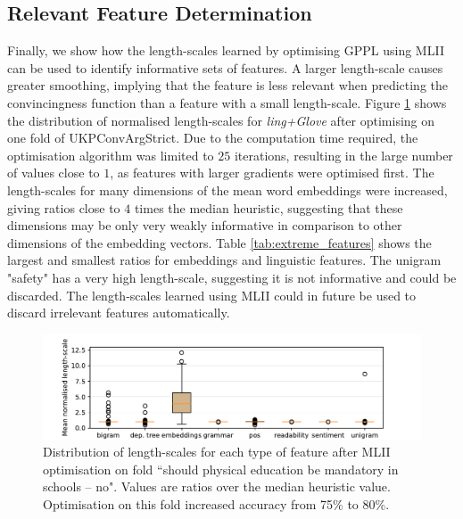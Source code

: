 \subsection{Relevant Feature Determination}

Finally, we show how the length-scales learned by optimising GPPL using MLII can be used to identify
informative sets of features. 
A larger length-scale causes greater smoothing, 
implying that the feature is less relevant when predicting the convincingness function
than a feature with a small length-scale. 
Figure \ref{fig:boxplot} shows the distribution of normalised length-scales for \emph{ling+Glove}
after optimising on one fold of UKPConvArgStrict. 
Due to the computation time required, the optimisation algorithm was limited to $25$ iterations, resulting in the large number of values close to $1$,
as features with larger gradients were optimised first.
The length-scales for many dimensions of the mean word embeddings were increased,
giving ratios close to $4$ times the median heuristic, 
suggesting that these dimensions may be
only very weakly informative in comparison to other dimensions of the embedding vectors. Table \ref{tab:extreme_features} shows the largest
and smallest ratios for embeddings and linguistic features. The unigram "safety" has
a very high length-scale, suggesting it is not informative and could be discarded. 
The length-scales learned using MLII could in future be used to discard irrelevant features
automatically. 
\begin{figure}[h]
\includegraphics[width=\columnwidth, clip=True, trim=32 0 57 0]{figures/features/boxplot}
\caption{Distribution of length-scales for each type of feature after MLII optimisation 
on fold ``should physical education be mandatory in schools -- no". 
Values are ratios over the median heuristic value. 
Optimisation on this fold increased accuracy from 75\% to 80\%. }
\label{fig:boxplot}
\end{figure}
